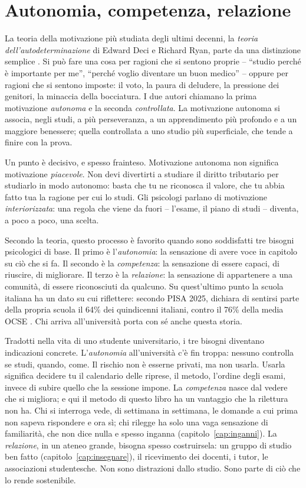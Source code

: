 \section{Autonomia, competenza, relazione}

La teoria della motivazione più studiata degli ultimi decenni, la
\emph{teoria dell'autodeterminazione} di Edward Deci e Richard Ryan,
parte da una distinzione semplice \parencite{ryan2000}. Si può fare una
cosa per ragioni che si sentono proprie -- \enquote{studio perché è
importante per me}, \enquote{perché voglio diventare un buon medico}
-- oppure per ragioni che si sentono imposte: il voto, la paura di
deludere, la pressione dei genitori, la minaccia della bocciatura. I
due autori chiamano la prima motivazione \emph{autonoma} e la seconda
\emph{controllata}. La motivazione autonoma si associa, negli studi, a
più perseveranza, a un apprendimento più profondo e a un maggiore
benessere; quella controllata a uno studio più superficiale, che tende
a finire con la prova.

Un punto è decisivo, e spesso frainteso. Motivazione autonoma non
significa motivazione \emph{piacevole}. Non devi divertirti a studiare
il diritto tributario per studiarlo in modo autonomo: basta che tu ne
riconosca il valore, che tu abbia fatto tua la ragione per cui lo
studi. Gli psicologi parlano di motivazione \emph{interiorizzata}: una
regola che viene da fuori -- l'esame, il piano di studi -- diventa, a
poco a poco, una scelta.

Secondo la teoria, questo processo è favorito quando sono soddisfatti
tre bisogni psicologici di base. Il primo è l'\emph{autonomia}: la
sensazione di avere voce in capitolo su ciò che si fa. Il secondo è la
\emph{competenza}: la sensazione di essere capaci, di riuscire, di
migliorare. Il terzo è la \emph{relazione}: la sensazione di appartenere
a una comunità, di essere riconosciuti da qualcuno. Su quest'ultimo
punto la scuola italiana ha un dato su cui riflettere: secondo PISA
2025, dichiara di sentirsi parte della propria scuola il 64\% dei
quindicenni italiani, contro il 76\% della media OCSE
\parencite{oecd2026pisa}. Chi arriva all'università porta con sé anche
questa storia.

Tradotti nella vita di uno studente universitario, i tre bisogni
diventano indicazioni concrete. L'\emph{autonomia} all'università c'è
fin troppa: nessuno controlla se studi, quando, come. Il rischio non è
esserne privati, ma non usarla. Usarla significa decidere tu il
calendario delle riprese, il metodo, l'ordine degli esami, invece di
subire quello che la sessione impone. La \emph{competenza} nasce dal
vedere che si migliora; e qui il metodo di questo libro ha un vantaggio
che la rilettura non ha. Chi si interroga vede, di settimana in
settimana, le domande a cui prima non sapeva rispondere e ora sì; chi
rilegge ha solo una vaga sensazione di familiarità, che non dice nulla
e spesso inganna (capitolo~\ref{cap:inganni}). La \emph{relazione}, in
un ateneo grande, bisogna spesso costruirsela: un gruppo di studio ben
fatto (capitolo~\ref{cap:insegnare}), il ricevimento dei docenti, i
tutor, le associazioni studentesche. Non sono distrazioni dallo
studio. Sono parte di ciò che lo rende sostenibile.

